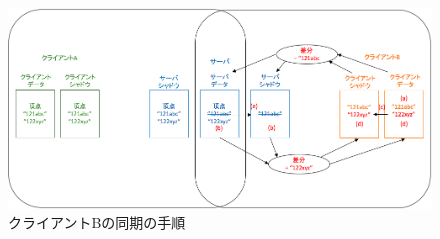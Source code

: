 \begin{figure}[htbp]
  \begin{center}
    \includegraphics[scale=0.45]{images/sycle2}
    \caption{クライアントBの同期の手順}
    \label{sycle2}
  \end{center}
\end{figure}
